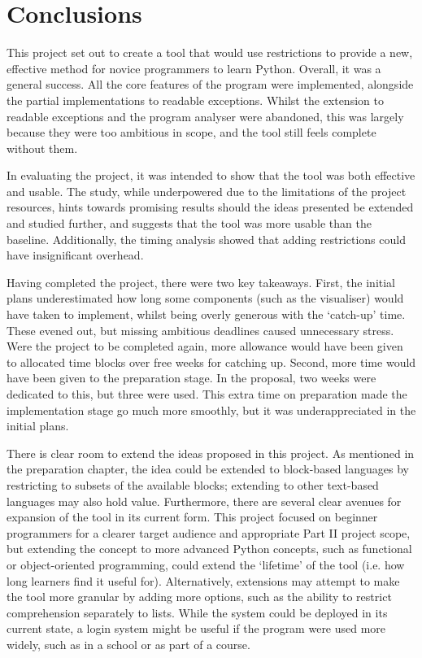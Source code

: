 \chapter{Conclusions}

This project set out to create a tool that would use restrictions to provide a new, effective method for novice programmers to learn Python. Overall, it was a general success. All the core features of the program were implemented, alongside the partial implementations to readable exceptions. Whilst the extension to readable exceptions and the program analyser were abandoned, this was largely because they were too ambitious in scope, and the tool still feels complete without them.

In evaluating the project, it was intended to show that the tool was both effective and usable. The study, while underpowered due to the limitations of the project resources, hints towards promising results should the ideas presented be extended and studied further, and suggests that the tool was more usable than the baseline. Additionally, the timing analysis showed that adding restrictions could have insignificant overhead.

Having completed the project, there were two key takeaways. First, the initial plans underestimated how long some components (such as the visualiser) would have taken to implement, whilst being overly generous with the `catch-up' time. These evened out, but missing ambitious deadlines caused unnecessary stress. Were the project to be completed again, more allowance would have been given to allocated time blocks over free weeks for catching up. Second, more time would have been given to the preparation stage. In the proposal, two weeks were dedicated to this, but three were used. This extra time on preparation made the implementation stage go much more smoothly, but it was underappreciated in the initial plans.

There is clear room to extend the ideas proposed in this project. As mentioned in the preparation chapter, the idea could be extended to block-based languages by restricting to subsets of the available blocks; extending to other text-based languages may also hold value. Furthermore, there are several clear avenues for expansion of the tool in its current form. This project focused on beginner programmers for a clearer target audience and appropriate Part II project scope, but extending the concept to more advanced Python concepts, such as functional or object-oriented programming, could extend the `lifetime' of the tool (i.e. how long learners find it useful for). Alternatively, extensions may attempt to make the tool more granular by adding more options, such as the ability to restrict comprehension separately to lists. While the system could be deployed in its current state, a login system might be useful if the program were used more widely, such as in a school or as part of a course.

